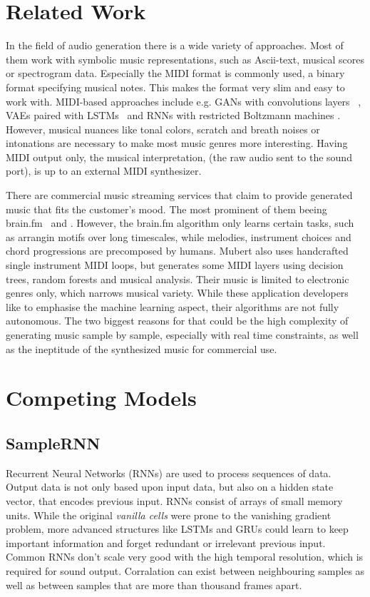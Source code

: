 \documentclass[12pt]{article}
\begin{document}
\section{Related Work}
In the field of audio generation there is a wide variety of approaches.
Most of them work with symbolic music representations, such as Ascii-text, musical scores or spectrogram data.
Especially the MIDI format is commonly used, a binary format specifying musical notes.
This makes the format very slim and easy to work with.
MIDI-based approaches include e.g. GANs with convolutions layers ~\cite{yang2017midinet, mogren2016c, mogren2016c}, VAEs paired with LSTMs~\cite{roberts2018hierarchical, tikhonov2017music, hennig2017classifying} and RNNs with restricted Boltzmann machines \cite{boulanger2012modeling}.
However, musical nuances like tonal colors, scratch and breath noises or intonations are necessary to make most music genres more interesting.
Having MIDI output only, the musical interpretation, (the raw audio sent to the sound port), is up to an external MIDI synthesizer.

There are commercial music streaming services that claim to provide generated music that fits the customer's mood.
The most prominent of them beeing brain.fm~\cite{brain.fm} and \cite{Mubert}.
However, the brain.fm algorithm only learns certain tasks, such as arrangin motifs over long timescales, while melodies, instrument choices and chord progressions are precomposed by humans.
Mubert also uses handcrafted single instrument MIDI loops, but generates some MIDI layers using decision trees, random forests and musical analysis.
Their music is limited to electronic genres only, which narrows musical variety.
While these application developers like to emphasise the machine learning aspect, their algorithms are not fully autonomous.
The two biggest reasons for that could be the high complexity of generating music sample by sample, especially with real time constraints, as well as the ineptitude of the synthesized music for commercial use.



\section{Competing Models}
\subsection{SampleRNN}
Recurrent Neural Networks (RNNs) are used to process sequences of data.
Output data is not only based upon input data, but also on a hidden state vector, that encodes previous input.
RNNs consist of arrays of small memory units.
While the original \emph{vanilla cells} were prone to the vanishing gradient problem, more advanced structures like LSTMs and GRUs could learn to keep important information and forget redundant or irrelevant previous input.
Common RNNs don't scale very good with the high temporal resolution, which is required for sound output.
Corralation can exist between neighbouring samples as well as between samples that are more than thousand frames apart.
\end{document}
